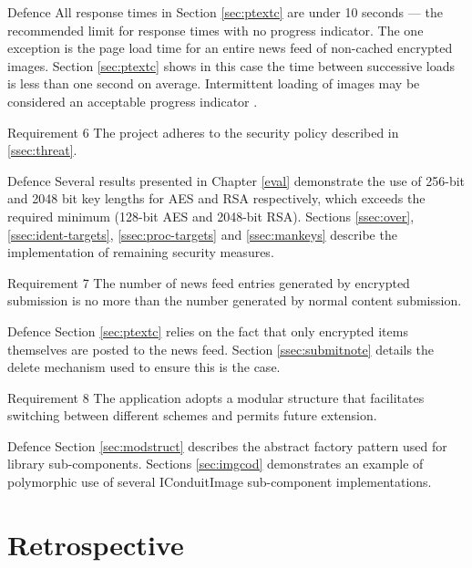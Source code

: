 \begin{desc}
    \item[Defence] All response times in Section \ref{sec:ptextc} are under 10 seconds --- the recommended limit for response times with no progress indicator. The one exception is the page load time for an entire news feed of non-cached encrypted images. Section \ref{sec:ptextc} shows in this case the time between successive loads is less than one second on average. Intermittent loading of images may be considered an acceptable progress indicator \cite{response}.

    \item[Requirement 6] The project adheres to the security policy described in \ref{ssec:threat}.
    
    \item[Defence] Several results presented in Chapter \ref{eval} demonstrate the use of 256-bit and 2048 bit key lengths for AES and RSA respectively, which exceeds the required minimum (128-bit AES and 2048-bit RSA). Sections \ref{ssec:over}, \ref{ssec:ident-targets}, \ref{ssec:proc-targets} and \ref{ssec:mankeys} describe the implementation of remaining security measures.

    \item[Requirement 7] The number of news feed entries generated by encrypted submission is no more than the number generated by normal content submission.
    
    \item[Defence] Section \ref{sec:ptextc} relies on the fact that only encrypted items themselves are posted to the news feed. Section \ref{ssec:submitnote} details the delete mechanism used to ensure this is the case.
    

    \item[Requirement 8] The application adopts a modular structure that facilitates switching between different schemes and permits future extension.
    
    \item[Defence] Section \ref{sec:modstruct} describes the abstract factory pattern used for library sub-components. Sections \ref{sec:imgcod} demonstrates an example of polymorphic use of several IConduitImage sub-component implementations.
    
\end{desc}



\section{Retrospective}
\label{sec:retro}

